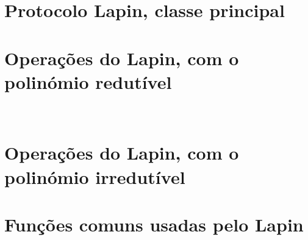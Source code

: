\section{Protocolo Lapin, classe principal}


\section{Operações do Lapin, com o polinómio redutível}

\
\section{Operações do Lapin, com o polinómio irredutível}


\section{Funções comuns usadas pelo Lapin}
